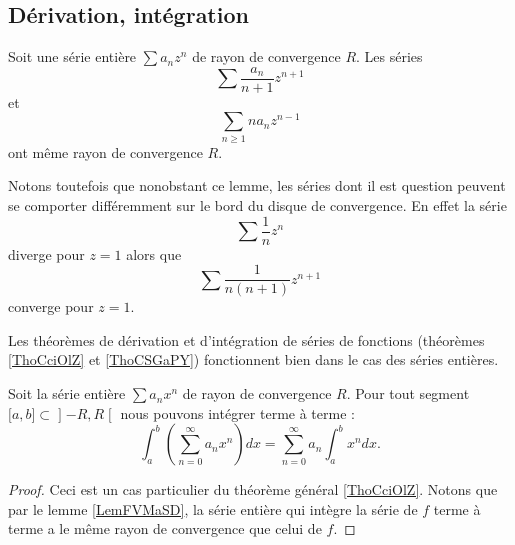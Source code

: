 \subsection{Dérivation, intégration}

\begin{lemma}       \label{LemFVMaSD}
    Soit une série entière \( \sum a_nz^n\) de rayon de convergence \( R\). Les séries
    \begin{equation}
        \sum \frac{ a_n }{ n+1 }z^{n+1}
    \end{equation}
    et
    \begin{equation}
        \sum_{n\geq 1}na_nz^{n-1}
    \end{equation}
    ont même rayon de convergence \( R\).
\end{lemma}

Notons toutefois que nonobstant ce lemme, les séries dont il est question peuvent se comporter différemment sur le bord du disque de convergence. En effet la série
\begin{equation}
    \sum \frac{1}{ n }z^n
\end{equation}
diverge pour \( z=1\) alors que 
\begin{equation}
    \sum\frac{1}{ n(n+1) }z^{n+1}
\end{equation}
converge pour \( z=1\).


Les théorèmes de dérivation et d'intégration de séries de fonctions (théorèmes \ref{ThoCciOlZ} et \ref{ThoCSGaPY}) fonctionnent bien dans le cas des séries entières.

\begin{proposition} \label{PropfeFQWr}
    Soit la série entière $\sum a_nx^n$ de rayon de convergence \( R\). Pour tout segment \( \mathopen[ a , b \mathclose]\subset\mathopen] -R , R \mathclose[\) nous pouvons intégrer terme à terme :
    \begin{equation}
        \int_a^b\left( \sum_{n=0}^{\infty}a_nx^n\right)dx=\sum_{n=0}^{\infty}a_n\int_a^bx^ndx.
    \end{equation}
\end{proposition}

\begin{proof}
    Ceci est un cas particulier du théorème général \ref{ThoCciOlZ}. Notons que par le lemme \ref{LemFVMaSD}, la série entière qui intègre la série de \( f\) terme à terme a le même rayon de convergence que celui de \( f\).
\end{proof}

